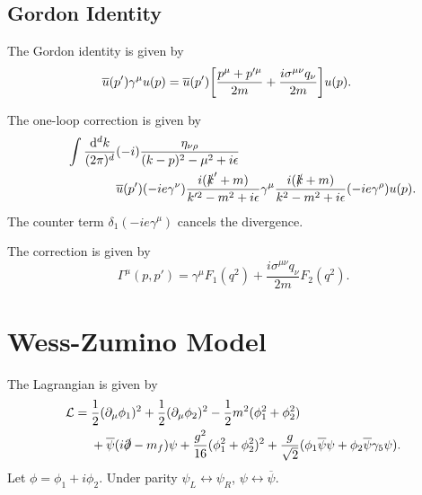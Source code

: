 \documentclass{article}
\begin{document}
\subsection{Gordon Identity}

The Gordon identity is given by
\begin{align*}
    \overline{u}(p') \gamma^\mu u(p) &= \overline{u}(p')\qty[\frac{p^\mu + p'^\mu}{2m} + \frac{i\sigma^{\mu\nu}q_\nu}{2m}] u(p).
\end{align*}

The one-loop correction is given by
\begin{align*}
    &{\phantom{{}={}}} \int \frac{\dd[d]{k}}{(2\pi)^d} (-i) \frac{\eta_{\nu\rho}}{(k-p)^2 - \mu^2 + i\epsilon} \\
    &{\phantom{{}={}\int \frac{\dd[d]{k}}{(2\pi)^d}}}\overline{u}(p')(-ie\gamma^\nu) \frac{i(\slashed{k}'+m)}{k'^2 - m^2 + i\epsilon} \gamma^\mu \frac{i(\slashed{k}+m)}{k^2 - m^2 + i\epsilon}(-ie\gamma^\rho) u(p).
\end{align*}
The counter term $\delta_1(-ie\gamma^\mu)$ cancels the divergence.
\par
The correction is given by
\[ \Gamma^\mu(p,p') = \gamma^\mu F_1(q^2) + \frac{i\sigma^{\mu\nu} q_\nu}{2m} F_2(q^2). \]

\section{Wess-Zumino Model}

The Lagrangian is given by
\begin{align*}
    \mathcal{L} &= \frac{1}{2}(\partial_\mu \phi_1)^2 + \frac{1}{2}(\partial_\mu \phi_2)^2 - \frac{1}{2} m^2 (\phi^2_1 + \phi^2_2) \\
    &{\phantom{{}={}}} + \overline{\psi}(i\slashed{\partial} - m_f) \psi + \frac{g^2}{16}(\phi_1^2 + \phi_2^2)^2 + \frac{g}{\sqrt{2}}(\phi_1 \overline{\psi} \psi + \phi_2 \overline{\psi} \gamma_5 \psi).
\end{align*}
Let $\phi = \phi_1 + i\phi_2$.
Under parity $\psi_L \leftrightarrow \psi_R$, $\psi \leftrightarrow \overline{\psi}$.

% 
% 
\end{document}
